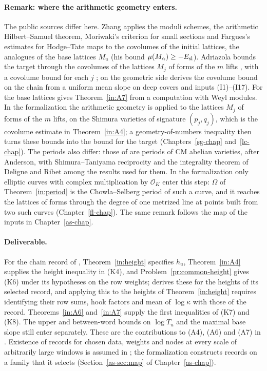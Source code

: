 \documentclass[reqno]{amsart}
\newcounter{chap}
\theoremstyle{definition}
\theoremstyle{plain}
\newcommand{\Oc}{\mathcal O}
\begin{document}
\paragraph{Remark: where the arithmetic geometry enters.}
The public sources differ here.  Zhang \cite[\S4.3]{Zh} applies the moduli schemes, the
arithmetic Hilbert--Samuel theorem, Moriwaki's criterion for small
sections and Fargues's estimates for Hodge--Tate maps to the covolumes of
the initial lattices, the analogues of the base lattices $M_u$ (his
bound $\mu(M_\alpha)\ge-E_{\rm sl}$).  Adriazola bounds the target
through the covolumes of the lattices $M_j$ of forms of the $m$ lifts
\cite[Prop.~15.53, Thm.~15.70]{Adr}, with a covolume bound for each $j$
\cite[Hyp.~15.58]{Adr}; on the geometric side \cite[Thm.~15.66]{Adr}
derives the covolume bound on the chain \cite[Hyp.~15.59]{Adr} from a
uniform mean slope on deep covers \cite[Hyp.~15.69]{Adr} and inputs
(I1)--(I17).  For the base lattices \cite[Thm.~15.33]{Adr} gives
Theorem~\ref{in:A7} from a computation with Weyl modules.  In the formalization the
arithmetic geometry is applied to the lattices $M_j$ of forms of the $m$
lifts, on the Shimura varieties of signature $(p_j,q_j)$, which is the
covolume estimate in Theorem~\ref{in:A4}; a geometry-of-numbers
inequality then turns these bounds into the bound for the target
(Chapters~\ref{sg-chap} and~\ref{lc-chap}).  The periods also differ:
those of \cite{Zh} are periods of CM abelian varieties, after Anderson,
with Shimura--Taniyama reciprocity and the integrality theorem of
Deligne and Ribet among the results used for them.  In the formalization
only elliptic curves with complex multiplication by $\Oc_K$ enter this
step: $\Omega$ of Theorem~\ref{in:period} is the Chowla--Selberg period
of such a curve, and it reaches the lattices of forms through the degree
of one metrized line at points built from two such curves
(Chapter~\ref{fl-chap}).  The same remark follows the map of the inputs
in Chapter~\ref{as-chap}.

\paragraph{Deliverable.}
For the chain record of \cite[Def.~18.9]{Adr}, Theorem~\ref{in:height}
specifies $h_u$, Theorem~\ref{in:A4} supplies the height inequality in
(K4), and Problem~\ref{pr:common-height} gives (K6) under its hypotheses
on the row weights; \cite[\S18.7]{Adr} derives these for the heights of
its selected record, and applying this to the heights of
Theorem~\ref{in:height} requires identifying their row sums, hook
factors and mean of $\log\kappa$ with those of the record.  Theorems~\ref{in:A6} and~\ref{in:A7} supply
the first inequalities of (K7) and (K8).  The upper and between-word
bounds on $\log T_u$ and the maximal base slope still enter
\cite[Prop.~18.11(vii)--(viii)]{Adr} separately.  These are the
contributions to (A4), (A6) and (A7) in \cite[Prop.~18.14]{Adr}.
Existence of records for chosen data, weights and nodes at every scale
of arbitrarily large windows is assumed in \cite[Hyp.~18.10]{Adr}; the
formalization constructs records on a family that it selects
(Section~\ref{as-sec:map} of Chapter~\ref{as-chap}).
\end{document}
